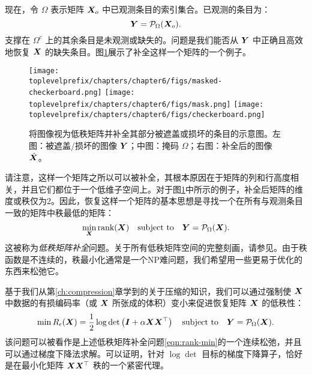 \documentclass[../../book-main_zh.tex]{subfiles}
\begin{document}
现在，令 $\Omega$ 表示矩阵 $\bm{X}_o$ 中已观测条目的索引集合。已观测的条目为：
\begin{equation}
\bm{Y} = \mathcal{P}_{\Omega}(\bm{X}_o).
\end{equation}
支撑在 $\Omega^c$ 上的其余条目是未观测或缺失的。问题是我们能否从 $\bm{Y}$ 中正确且高效地恢复 $\bm{X}$ 的缺失条目。图\ref{fig:matrix-completion}展示了补全这样一个矩阵的一个例子。

\begin{figure}
\centering
\texttt{[image: \\toplevelprefix/chapters/chapter6/figs/masked-checkerboard.png]}\;\;
\texttt{[image: \\toplevelprefix/chapters/chapter6/figs/mask.png]}\;\;
\texttt{[image: \\toplevelprefix/chapters/chapter6/figs/checkerboard.png]}
\caption{将图像视为低秩矩阵并补全其部分被遮盖或损坏的条目的示意图。左图：被遮盖/损坏的图像 $\bm{Y}$；中图：掩码 $\Omega$；右图：补全后的图像 $\hat {\bm{X}}$。}
\label{fig:matrix-completion}
\end{figure}

请注意，这样一个矩阵之所以可以被补全，其根本原因在于矩阵的列和行高度相关，并且它们都位于一个低维子空间上。对于图\ref{fig:matrix-completion}中所示的例子，补全后矩阵的维度或秩仅为2。因此，恢复这样一个矩阵的基本思想是寻找一个在所有与观测条目一致的矩阵中秩最低的矩阵：
\begin{equation}
\min_{\bm{X}} \mbox{rank}(\bm{X}) \quad \mbox{subject to}
\quad
\bm{Y} = \mathcal{P}_{\Omega}(\bm{X}).
\label{eqn:rank-min}
\end{equation}
这被称为{\em 低秩矩阵补全}问题。关于所有低秩矩阵空间的完整刻画，请参见\cite{Wright-Ma-2022}。由于秩函数是不连续的，秩最小化通常是一个NP难问题，我们希望用一些更易于优化的东西来松弛它。

基于我们从第\ref{ch:compression}章学到的关于压缩的知识，我们可以通过强制使 $\bm{X}$ 中数据的有损编码率（或 $\bm{X}$ 所张成的体积）变小来促进恢复矩阵 $\bm{X}$ 的低秩性：
\begin{equation}
\min R_\epsilon(\bm{X}) = \frac{1}{2} \log \det \left(\boldsymbol{I} +
\alpha  \bm{X}\bm{X}^\top \right) \quad \mbox{subject to}
\quad
\bm{Y} = \mathcal{P}_{\Omega}(\bm{X}).
\label{eqn:rate-min}
\end{equation}
该问题可以被看作是上述低秩矩阵补全问题\eqref{eqn:rank-min}的一个连续松弛，并且可以通过梯度下降法求解。可以证明，针对 $\log\det$ 目标的梯度下降算子，恰好是在最小化矩阵 $\bm{X}\bm{X}^\top$ 秩的一个紧密代理。
\end{document}
